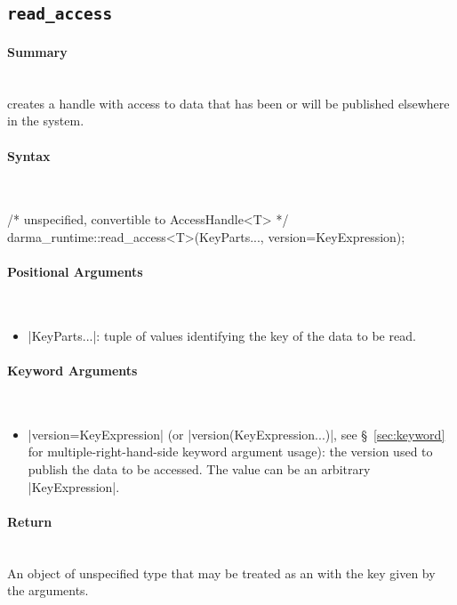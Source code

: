 \subsection{\texttt{read\_access}}
\label{ssec:api_fe_read_access}

\paragraph{Summary}\mbox{}\\
 creates a \gls{handle} with  access to data that has been or will be
published elsewhere in the system.


\paragraph{Syntax}\mbox{}\\
\begin{CppCode}
/* unspecified, convertible to AccessHandle<T> */
darma_runtime::read_access<T>(KeyParts..., version=KeyExpression);
\end{CppCode}


\paragraph{Positional Arguments}\mbox{}\\
\begin{itemize}
  \item |KeyParts...|: tuple of values identifying the key of the data to
  be read.
\end{itemize}

\paragraph{Keyword Arguments}\mbox{}\\
\begin{itemize}
  \item |version=KeyExpression| (or |version(KeyExpression...)|,
see \S~\ref{sec:keyword} for multiple-right-hand-side keyword argument usage):
the version used to publish the data to be accessed.
The value can be an arbitrary |KeyExpression|.
\end{itemize}


\paragraph{Return}\mbox{}\\
An object of unspecified type that may be treated as an 
with the key given by the arguments.

